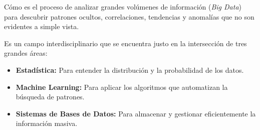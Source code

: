 Cómo es el proceso de analizar grandes volúmenes de información (\textit{Big Data}) para descubrir patrones ocultos, correlaciones, tendencias y anomalías que no son evidentes a simple vista.

Es un campo interdisciplinario que se encuentra justo en la intersección de tres grandes áreas:
\begin{itemize}
    \item \textbf{Estadística:} Para entender la distribución y la probabilidad de los datos.
    \item \textbf{Machine Learning:} Para aplicar los algoritmos que automatizan la búsqueda de patrones.
    \item \textbf{Sistemas de Bases de Datos:} Para almacenar y gestionar eficientemente la información masiva.
\end{itemize}
